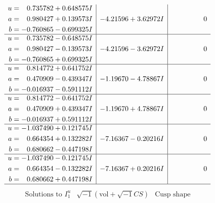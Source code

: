 \documentclass[1p]{elsarticle_modified}
\theoremstyle{definition}
\newcommand{\I}{\sqrt{-1}}
\begin{document}
$$\begin{array}{c|c|c}
\begin{aligned}
u &= \phantom{-}0.735782 + 0.648575 I \\
a &= \phantom{-}0.980427 + 0.139573 I \\
b &= -0.760865 - 0.699325 I\end{aligned}
 & -4.21596 + 3.62972 I & \phantom{-0.000000 } 0 \\ \hline\begin{aligned}
u &= \phantom{-}0.735782 - 0.648575 I \\
a &= \phantom{-}0.980427 - 0.139573 I \\
b &= -0.760865 + 0.699325 I\end{aligned}
 & -4.21596 - 3.62972 I & \phantom{-0.000000 } 0 \\ \hline\begin{aligned}
u &= \phantom{-}0.814772 + 0.641752 I \\
a &= \phantom{-}0.470909 - 0.439347 I \\
b &= -0.016937 - 0.591112 I\end{aligned}
 & -1.19670 - 4.78867 I & \phantom{-0.000000 } 0 \\ \hline\begin{aligned}
u &= \phantom{-}0.814772 - 0.641752 I \\
a &= \phantom{-}0.470909 + 0.439347 I \\
b &= -0.016937 + 0.591112 I\end{aligned}
 & -1.19670 + 4.78867 I & \phantom{-0.000000 } 0 \\ \hline\begin{aligned}
u &= -1.037490 + 0.121745 I \\
a &= \phantom{-}0.664354 + 0.132282 I \\
b &= \phantom{-}0.680662 - 0.447198 I\end{aligned}
 & -7.16367 - 0.20216 I & \phantom{-0.000000 } 0 \\ \hline\begin{aligned}
u &= -1.037490 - 0.121745 I \\
a &= \phantom{-}0.664354 - 0.132282 I \\
b &= \phantom{-}0.680662 + 0.447198 I\end{aligned}
 & -7.16367 + 0.20216 I & \phantom{-0.000000 } 0\\
 \hline 
 \end{array}$$\newpage$$\begin{array}{c|c|c}  
\text{Solutions to }I^u_{1}& \I (\text{vol} + \sqrt{-1}CS) & \text{Cusp shape}\\
 \hline 
\begin{aligned}

\end{aligned}
\end{array}$$
\end{document}
